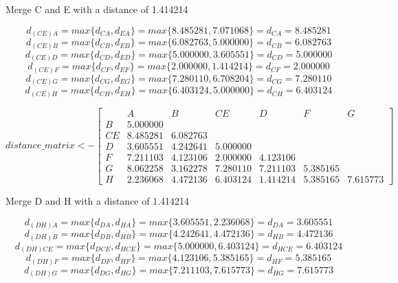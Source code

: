 \documentclass{report}
\begin{document}
Merge C and E with a distance of 1.414214

\begin{equation}
  d_{(CE)A} = max\{d_{CA}, d_{EA}\} = max\{8.485281, 7.071068\} = d_{CA} = 8.485281
\end{equation}
\begin{equation}
  d_{(CE)B} = max\{d_{CB}, d_{EB}\} = max\{6.082763, 5.000000\} = d_{CB} = 6.082763
\end{equation}
\begin{equation}
  d_{(CE)D} = max\{d_{CD}, d_{ED}\} = max\{5.000000, 3.605551\} = d_{CD} = 5.000000
\end{equation}
\begin{equation}
  d_{(CE)F} = max\{d_{CF}, d_{EF}\} = max\{2.000000, 1.414214\} = d_{CF} = 2.000000
\end{equation}
\begin{equation}
  d_{(CE)G} = max\{d_{CG}, d_{EG}\} = max\{7.280110, 6.708204\} = d_{CG} = 7.280110
\end{equation}
\begin{equation}
  d_{(CE)H} = max\{d_{CH}, d_{EH}\} = max\{6.403124, 5.000000\} = d_{CH} = 6.403124
\end{equation}


\[
  distance\_matrix <- 
  \begin{bmatrix}
       & A        & B        & CE       & D        & F        & G        \\
    B  & 5.000000 &          &          &          &          &          \\
    CE & 8.485281 & 6.082763 &          &          &          &          \\
    D  & 3.605551 & 4.242641 & 5.000000 &          &          &          \\
    F  & 7.211103 & 4.123106 & 2.000000 & 4.123106 &          &          \\
    G  & 8.062258 & 3.162278 & 7.280110 & 7.211103 & 5.385165 &          \\
    H  & 2.236068 & 4.472136 & 6.403124 & 1.414214 & 5.385165 & 7.615773
  \end{bmatrix}
\]

Merge D and H with a distance of 1.414214

\begin{equation}
  d_{(DH)A} = max\{d_{DA}, d_{HA}\} = max\{3.605551, 2.236068\} = d_{DA} = 3.605551
\end{equation}
\begin{equation}
  d_{(DH)B} = max\{d_{DB}, d_{HB}\} = max\{4.242641, 4.472136\} = d_{HB} = 4.472136
\end{equation}
\begin{equation}
  d_{(DH)CE} = max\{d_{DCE}, d_{HCE}\} = max\{5.000000, 6.403124\} = d_{HCE} = 6.403124
\end{equation}
\begin{equation}
  d_{(DH)F} = max\{d_{DF}, d_{HF}\} = max\{4.123106, 5.385165\} = d_{HF} = 5.385165
\end{equation}
\begin{equation}
  d_{(DH)G} = max\{d_{DG}, d_{HG}\} = max\{7.211103, 7.615773\} = d_{HG} = 7.615773
\end{equation}
\end{document}
